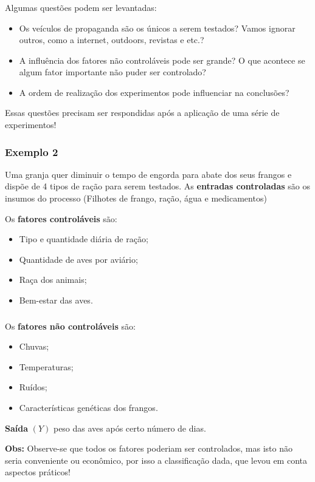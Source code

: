 \documentclass[14pt,aspectratio=1610]{beamer}
\begin{document}
\begin{frame}{}
\frametitle{}
\begin{block}{}
\justifying
Algumas questões podem ser levantadas:
\begin{itemize}
\item Os veículos de propaganda são os únicos a serem testados? Vamos ignorar outros, como a internet, outdoors, revistas e etc.?\pause
\item A influência dos fatores não controláveis pode ser grande? O que acontece se algum fator importante não puder ser controlado?\pause
\item A ordem de realização dos experimentos pode influenciar na conclusões?\pause
\end{itemize}
Essas questões precisam ser respondidas após a aplicação de uma série de experimentos!
\end{block}
\end{frame}

\begin{frame}{}
\frametitle{Exemplo 2}
\begin{block}{}
\justifying
Uma granja quer diminuir o tempo de engorda para abate dos seus frangos e dispõe de 4 tipos de ração para serem testados.
As {\bf entradas controladas} são os insumos do processo (Filhotes de frango, ração, água e medicamentos)

Os {\bf fatores controláveis} são:
\begin{itemize}
\item Tipo e quantidade diária de ração;\pause
\item Quantidade de aves por aviário;\pause
\item Raça dos animais;\pause
\item Bem-estar das aves.
\end{itemize}
\end{block}
\end{frame}

\begin{frame}{}
\frametitle{}
\begin{block}{}
\justifying
Os {\bf fatores não controláveis} são:
\begin{itemize}
\item Chuvas;\pause
\item Temperaturas;\pause
\item Ruídos;\pause
\item Características genéticas dos frangos.\pause
\end{itemize}

{\bf Saída} $(Y)$ peso das aves após certo número de dias.\pause

{\bf Obs:} Observe-se que todos os fatores poderiam ser controlados, mas isto não seria conveniente ou econômico, por isso a classificação dada, que levou em conta aspectos práticos!
\end{block}
\end{frame}
\end{document}
